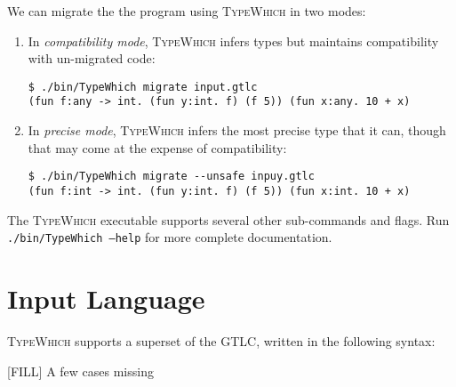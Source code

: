 \documentclass{article}
\newcommand{\system}{\textsc{TypeWhich}\xspace}
\begin{document}
We can migrate the the program using \system in two modes:

\begin{enumerate}

\item In \emph{compatibility mode}, \system infers types but maintains
compatibility with un-migrated code:

\begin{verbatim}
$ ./bin/TypeWhich migrate input.gtlc
(fun f:any -> int. (fun y:int. f) (f 5)) (fun x:any. 10 + x)
\end{verbatim}

\item In \emph{precise mode}, \system infers the most precise type that it
can, though that may come at the expense of compatibility:

\begin{verbatim}
$ ./bin/TypeWhich migrate --unsafe inpuy.gtlc
(fun f:int -> int. (fun y:int. f) (f 5)) (fun x:int. 10 + x)
\end{verbatim}
     
\end{enumerate}

The \system executable supports several other sub-commands and flags. 
Run \texttt{./bin/TypeWhich --help} for more complete documentation.

\section{Input Language}\label{input-lang-gtlc}

\system supports a superset of the GTLC, written in the following syntax:

[FILL] A few cases missing
\end{document}
